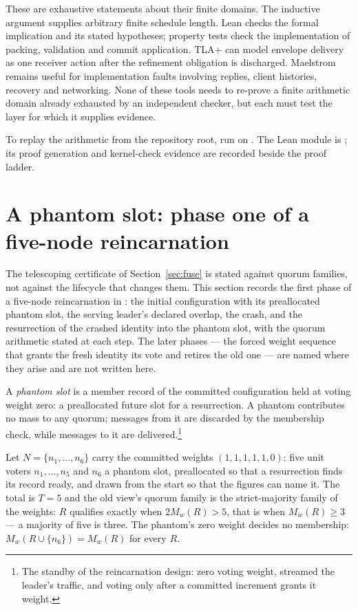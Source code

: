 These are exhaustive statements about their finite domains. The inductive
argument supplies arbitrary finite schedule length. Lean checks the formal
implication and its stated hypotheses; property tests check the implementation
of packing, validation and commit application. TLA+ can model envelope delivery
as one receiver action after the refinement obligation is discharged.
Maelstrom remains useful for implementation faults involving replies, client
histories, recovery and networking. None of these tools needs to re-prove a
finite arithmetic domain already exhausted by an independent checker, but
each must test the layer for which it supplies evidence.

To replay the arithmetic from the repository root, run  on
.
The Lean module is ; its proof
generation and kernel-check evidence are recorded beside the proof ladder.

\section{A phantom slot: phase one of a five-node
reincarnation}\label{sec:phantom}
The telescoping certificate of Section~\ref{sec:fuse} is stated against quorum
families, not against the lifecycle that changes them. This section records the
first phase of a five-node reincarnation in \systemname{}: the initial
configuration with its preallocated phantom slot, the serving leader's declared
overlap, the crash, and the resurrection of the crashed identity into the
phantom slot, with the quorum arithmetic stated at each step. The later phases
--- the forced weight sequence that grants the fresh identity its vote and
retires the old one --- are named where they arise and are not written here.

\begin{definition}\label{def:phantom}
A \emph{phantom slot} is a member record of the committed configuration held at
voting weight zero: a preallocated future slot for a resurrection. A phantom
contributes no mass to any quorum; messages from it are discarded by the
membership check, while messages to it are delivered.\footnote{The standby of
the reincarnation design: zero voting weight, streamed the leader's traffic,
and voting only after a committed increment grants it weight.}
\end{definition}

Let $N=\{n_1,\dotsc,n_6\}$ carry the committed weights $(1,1,1,1,1,0)$: five
unit voters $n_1,\dotsc,n_5$ and $n_6$ a phantom slot, preallocated so that a
resurrection finds its record ready, and drawn from the start so that the
figures can name it. The total is $T=5$ and the old view's quorum family is the
strict-majority family of the weights: $R$ qualifies exactly when
$2M_w(R)>5$, that is when $M_w(R)\geq3$ --- a majority of five is three. The
phantom's zero weight decides no membership: $M_w(R\cup\{n_6\})=M_w(R)$ for
every $R$.


